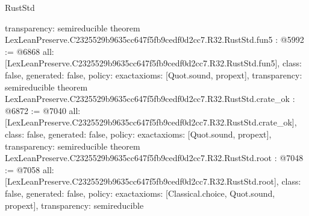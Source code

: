 \begin{lexlean}{RustStd}
\begin{coremodule}
{  transparency: semireducible
}
theorem LexLeanPreserve.C2325529b9635cc647f5fb9cedf0d2cc7.R32.RustStd.fun5 : @5992 := @6868 {
  all: [LexLeanPreserve.C2325529b9635cc647f5fb9cedf0d2cc7.R32.RustStd.fun5],
  class: false,
  generated: false,
  policy: exact{axioms: [Quot.sound, propext]},
  transparency: semireducible
}
theorem LexLeanPreserve.C2325529b9635cc647f5fb9cedf0d2cc7.R32.RustStd.crate_ok : @6872 := @7040 {
  all: [LexLeanPreserve.C2325529b9635cc647f5fb9cedf0d2cc7.R32.RustStd.crate_ok],
  class: false,
  generated: false,
  policy: exact{axioms: [Quot.sound, propext]},
  transparency: semireducible
}
theorem LexLeanPreserve.C2325529b9635cc647f5fb9cedf0d2cc7.R32.RustStd.root : @7048 := @7058 {
  all: [LexLeanPreserve.C2325529b9635cc647f5fb9cedf0d2cc7.R32.RustStd.root],
  class: false,
  generated: false,
  policy: exact{axioms: [Classical.choice, Quot.sound, propext]},
  transparency: semireducible
}


\end{coremodule}
\end{lexlean}
